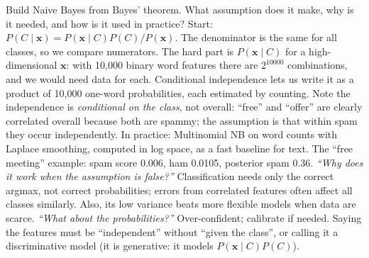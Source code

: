\begin{qa}{ Build Naive Bayes from Bayes' theorem. What assumption does it make, why is it
needed, and how is it used in practice?}
\why
Start: $P(C\mid\mathbf x) = P(\mathbf x\mid C)P(C)/P(\mathbf x)$. The denominator is the same for all classes, so we compare numerators.
The hard part is $P(\mathbf x\mid C)$ for a high-dimensional $\mathbf x$: with 10{,}000 binary word features there are $2^{10000}$
combinations, and we would need data for each. Conditional independence lets us write it as a product of 10{,}000 one-word
probabilities, each estimated by counting. Note the independence is \emph{conditional on the class}, not overall: ``free'' and
``offer'' are clearly correlated overall because both are spammy; the assumption is that within spam they occur independently.
In practice: Multinomial NB on word counts with Laplace smoothing, computed in log space, as a fast baseline for text.
\worked The ``free meeting'' example: spam score 0.006, ham 0.0105, posterior spam 0.36.
\pushes \emph{``Why does it work when the assumption is false?''} Classification needs only the correct argmax, not correct
probabilities; errors from correlated features often affect all classes similarly. Also, its low variance beats more flexible models
when data are scarce. \emph{``What about the probabilities?''} Over-confident; calibrate if needed.
\pitfall Saying the features must be ``independent'' without ``given the class'', or calling it a discriminative model (it is generative:
it models $P(\mathbf x\mid C)P(C)$).
\end{qa}

